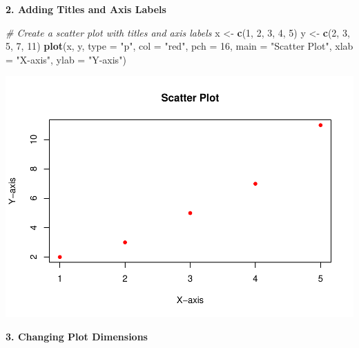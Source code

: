 \documentclass[
]{book}
\newenvironment{Shaded}{\begin{snugshade}}{\end{snugshade}}
\newcommand{\AttributeTok}[1]{\textcolor[rgb]{0.13,0.29,0.53}{#1}}
\newcommand{\CommentTok}[1]{\textcolor[rgb]{0.56,0.35,0.01}{\textit{#1}}}
\newcommand{\DecValTok}[1]{\textcolor[rgb]{0.00,0.00,0.81}{#1}}
\newcommand{\FunctionTok}[1]{\textcolor[rgb]{0.13,0.29,0.53}{\textbf{#1}}}
\newcommand{\NormalTok}[1]{#1}
\newcommand{\OtherTok}[1]{\textcolor[rgb]{0.56,0.35,0.01}{#1}}
\newcommand{\StringTok}[1]{\textcolor[rgb]{0.31,0.60,0.02}{#1}}
\begin{document}
\textbf{2. Adding Titles and Axis Labels}

\begin{Shaded}
\begin{Highlighting}[]
\CommentTok{\# Create a scatter plot with titles and axis labels}
\NormalTok{x }\OtherTok{\textless{}{-}} \FunctionTok{c}\NormalTok{(}\DecValTok{1}\NormalTok{, }\DecValTok{2}\NormalTok{, }\DecValTok{3}\NormalTok{, }\DecValTok{4}\NormalTok{, }\DecValTok{5}\NormalTok{)}
\NormalTok{y }\OtherTok{\textless{}{-}} \FunctionTok{c}\NormalTok{(}\DecValTok{2}\NormalTok{, }\DecValTok{3}\NormalTok{, }\DecValTok{5}\NormalTok{, }\DecValTok{7}\NormalTok{, }\DecValTok{11}\NormalTok{)}
\FunctionTok{plot}\NormalTok{(x, y, }\AttributeTok{type =} \StringTok{"p"}\NormalTok{, }\AttributeTok{col =} \StringTok{"red"}\NormalTok{, }\AttributeTok{pch =} \DecValTok{16}\NormalTok{, }\AttributeTok{main =} \StringTok{"Scatter Plot"}\NormalTok{, }\AttributeTok{xlab =} \StringTok{"X{-}axis"}\NormalTok{, }\AttributeTok{ylab =} \StringTok{"Y{-}axis"}\NormalTok{)}
\end{Highlighting}
\end{Shaded}

\includegraphics{_main_files/figure-latex/unnamed-chunk-33-1.pdf}

\textbf{3. Changing Plot Dimensions}
\end{document}
